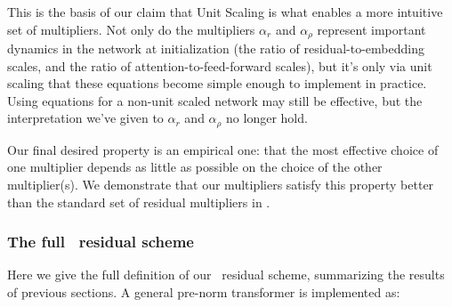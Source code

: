This is the basis of our claim that Unit Scaling is what enables a more intuitive set of multipliers. Not only do the multipliers $\alpha_r$ and $\alpha_\rho$ represent important dynamics in the network at initialization (the ratio of residual-to-embedding scales, and the ratio of attention-to-feed-forward scales), but it's only via unit scaling that these equations become simple enough to implement in practice. Using equations  for a non-unit scaled network may still be effective, but the interpretation we've given to $\alpha_r$ and $\alpha_\rho$ no longer hold.

Our final desired property is an empirical one: that the most effective choice of one multiplier depends as little as possible on the choice of the other multiplier(s). We demonstrate that our multipliers satisfy this property better than the standard set of residual multipliers in .

\subsubsection{The full \umup\ residual scheme} \label{subsubsec:umup_residual_in_full}

Here we give the full definition of our \umup\ residual scheme, summarizing the results of previous sections. A general pre-norm transformer is implemented as:

